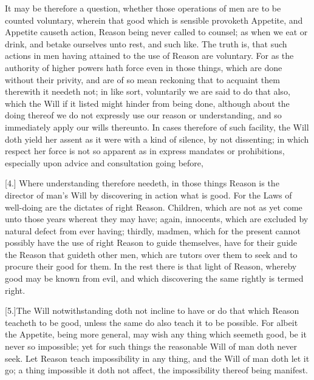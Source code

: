 It may be therefore a question, whether those operations of men are to be counted voluntary, wherein that good which is sensible provoketh Appetite, and Appetite causeth action, Reason being never called to counsel; as when we eat or drink, and betake ourselves unto rest, and such like. The truth is, that such actions in men having attained to the use of Reason are voluntary. For as the authority of higher powers hath force even in those things, which are done without their privity, and are of so mean reckoning that to acquaint them therewith it needeth not; in like sort, voluntarily we are said to do that also, which the Will if it listed might hinder from being done, although about the doing thereof we do not expressly use our reason or understanding, and so immediately apply our wills thereunto. In cases therefore of such facility, the Will doth yield her assent as it were with a kind of silence, by not dissenting; in which respect her force is not so apparent as in express mandates or prohibitions, especially upon advice and consultation going before,


[4.] Where understanding therefore needeth, in those things Reason is the director of man’s Will by discovering in action what is good. For the Laws of well-doing are the dictates of right Reason. Children, which are not as yet come unto those years whereat they may have; again, innocents, which are excluded by natural defect from ever having; thirdly, madmen, which for the present cannot possibly have the use of right Reason to guide themselves, have for their guide the Reason that guideth other men, which are tutors over them to seek and to procure their good for them. In the rest there is that light of Reason, whereby good may be known from evil, and which discovering the same rightly is termed right.

[5.]The Will notwithstanding doth not incline to have or do that which Reason teacheth to be good, unless the same do also teach it to be possible. For albeit the Appetite, being more general, may wish any thing which seemeth good, be it never so impossible; yet for such things the reasonable Will of man doth never seek. Let Reason teach impossibility in any thing, and the Will of man doth let it go; a thing impossible it doth not affect, the impossibility thereof being manifest.

